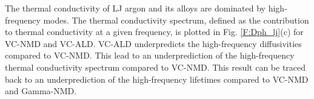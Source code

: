 \documentclass[aps,prb,onecolumn,preprint,footinbib,superscriptaddress,amsmath,amssymb,floatfix]{revtex4}
\newcommand{\kw}{\mspace{-4.0mu}\left(\mspace{-8.0mu}
\begin{smallmatrix}&\pmb{\kappa} \\&\omega\end{smallmatrix}
\mspace{-3.0mu}\right)}
\begin{document}
The thermal conductivity of LJ argon and its alloys are dominated 
by high-frequency modes. The thermal conductivity spectrum, defined as 
the contribution to thermal conductivity at a given frequency, 
is plotted in Fig. \ref{F:Dph_lj}(c) for VC-NMD and VC-ALD. 
VC-ALD underpredicts the high-frequency 
diffusivities compared to VC-NMD. This lead to an 
underprediction of the high-frequency thermal conductivity spectrum 
compared to VC-NMD. This result can be traced back 
to an underprediction of the high-frequency lifetimes compared to 
VC-NMD and Gamma-NMD. 



\end{document}
